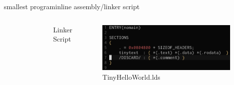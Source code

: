 \begin{frame}{smallest program}{inline assembly/linker script}
\begin{columns}[t]
\begin{figure}
        \end{figure}
        Linker Script
         \begin{figure}
            \begin{center}
                \includegraphics[width=\textwidth]{./img/linkscript.png}
                \caption{TinyHelloWorld.lds}
            \end{center}
        \end{figure}
    \end{columns}
\end{frame}
